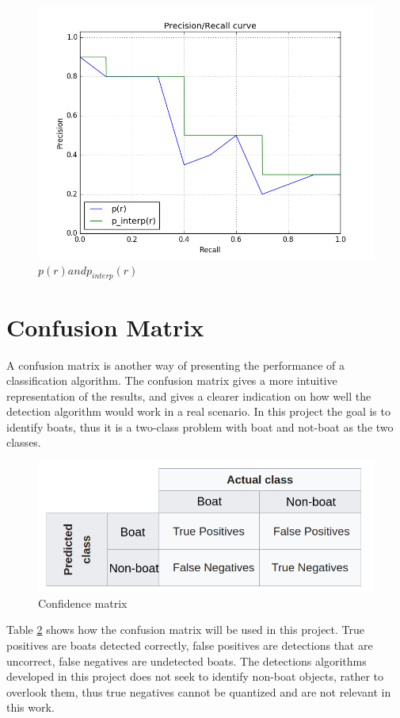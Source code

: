 \begin{figure}[h!]
    \centering
    \includegraphics[scale=0.5]{fig/p_interp.png}
    \caption{$p(r) and p_{interp}(r)$}
    \label{fig:p_interp}
\end{figure}

\section{Confusion Matrix}
\label{sec:conf_mat}
A confusion matrix is another way of presenting the performance of a classification algorithm. The confusion matrix gives a more intuitive representation of the results, and gives a clearer indication on how well the detection algorithm would work in a real scenario. In this project the goal is to identify boats, thus it is a two-class problem with boat and not-boat as the two classes. 

\begin{figure}[h!]
    \centering
    \includegraphics[width = 0.7 \textwidth]{fig/conf_e.png}
    \caption{Confidence matrix}
    \label{fig:conf_exp}
\end{figure}

\newpage

Table \ref{fig:conf_exp} shows how the confusion matrix will be used in this project. True positives are boats detected correctly, false positives are detections that are uncorrect, false negatives are undetected boats. The detections algorithms developed in this project does not seek to identify non-boat objects, rather to overlook them, thus true negatives cannot be quantized and are not relevant in this work.






\cleardoublepage